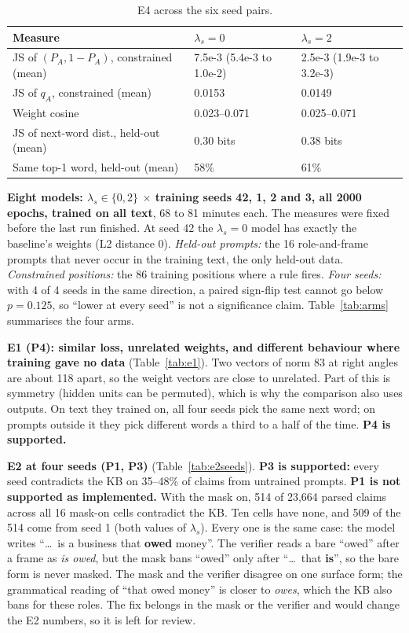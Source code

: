 \documentclass[letterpaper, 10pt, conference]{IEEEtran}
\begin{document}
\begin{table}[t]
\caption{E4 across the six seed pairs.}\label{tab:e4pairs}
\centering\footnotesize\setlength{\tabcolsep}{3pt}
\begin{tabular}{@{}L{3.6cm}L{2.2cm}L{2.2cm}@{}}
\toprule
Measure & $\lambda_s{=}0$ & $\lambda_s{=}2$\\
\midrule
JS of $(P_A,1{-}P_A)$, constrained (mean) & 7.5e-3 (5.4e-3 to 1.0e-2) & 2.5e-3 (1.9e-3 to 3.2e-3)\\
JS of $q_A$, constrained (mean) & 0.0153 & 0.0149\\
Weight cosine & 0.023--0.071 & 0.025--0.071\\
JS of next-word dist., held-out (mean) & 0.30 bits & 0.38 bits\\
Same top-1 word, held-out (mean) & 58\% & 61\%\\
\bottomrule
\end{tabular}
\end{table}

\textbf{Eight models: $\lambda_s\in\{0,2\}$ $\times$ training seeds 42, 1, 2 and 3, all 2000 epochs, trained on all text}, 68 to 81 minutes each. The measures were fixed before the last run finished. At seed 42 the $\lambda_s{=}0$ model has exactly the baseline's weights (L2 distance 0). \emph{Held-out prompts:} the 16 role-and-frame prompts that never occur in the training text, the only held-out data. \emph{Constrained positions:} the 86 training positions where a rule fires. \emph{Four seeds:} with 4 of 4 seeds in the same direction, a paired sign-flip test cannot go below $p{=}0.125$, so ``lower at every seed'' is not a significance claim. Table~\ref{tab:arms} summarises the four arms.

\textbf{E1 (P4): similar loss, unrelated weights, and different behaviour where training gave no data} (Table~\ref{tab:e1}). Two vectors of norm 83 at right angles are about 118 apart, so the weight vectors are close to unrelated. Part of this is symmetry (hidden units can be permuted), which is why the comparison also uses outputs. On text they trained on, all four seeds pick the same next word; on prompts outside it they pick different words a third to a half of the time. \textbf{P4 is supported.}

\textbf{E2 at four seeds (P1, P3)} (Table~\ref{tab:e2seeds}). \textbf{P3 is supported:} every seed contradicts the KB on 35--48\% of claims from untrained prompts. \textbf{P1 is not supported as implemented.} With the mask on, 514 of 23,664 parsed claims across all 16 mask-on cells contradict the KB. Ten cells have none, and 509 of the 514 come from seed 1 (both values of $\lambda_s$). Every one is the same case: the model writes ``\dots\ is a business that \textbf{owed} money''. The verifier reads a bare ``owed'' after a frame as \emph{is owed}, but the mask bans ``owed'' only after ``\dots\ that \textbf{is}'', so the bare form is never masked. The mask and the verifier disagree on one surface form; the grammatical reading of ``that owed money'' is closer to \emph{owes}, which the KB also bans for these roles. The fix belongs in the mask or the verifier and would change the E2 numbers, so it is left for review.
\end{document}

